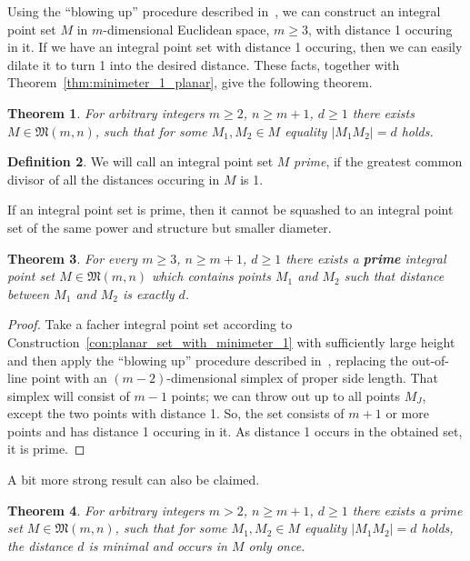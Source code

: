 \documentclass[a4paper,14pt]{article} %
\theoremstyle{plain}
\newtheorem{theorem}{Theorem}[section]
\theoremstyle{definition}
\newtheorem{definition}[theorem]{Definition}
\begin{document}
Using the ``blowing up'' procedure described in~\cite[theorem 1.3]{kurz2008bounds},
we can construct an integral point set $M$ in $m$-dimensional Euclidean space, $m\geq 3$,
with distance 1 occuring in it.
If we have an integral point set with distance 1 occuring,
then we can easily dilate it to turn 1 into the desired distance.
These facts, together with Theorem~\ref{thm:minimeter_1_planar}, give the following theorem.

\begin{theorem}
	For arbitrary integers $m \geq 2$, $n \geq m+1$, $d \geq 1$
	there exists $M\in\mathfrak{M}(m,n)$,
	such that for some $M_1, M_2\in M$ equality $|M_1 M_2| = d$ holds.
\end{theorem}


\begin{definition}
	\cite{noll1989nclusters}
	We will call an integral point set $M$ \textit{prime}, if the greatest common divisor
	of all the distances occuring in $M$ is 1.
\end{definition}

If an integral point set is prime,
then it cannot be squashed to an integral point set of the same power and structure but smaller diameter.


\begin{theorem}
	\label{thm:prime_with_desired_distance}
	For every $m \geq 3$, $n \geq m+1$, $d \geq 1$ there exists a \textbf{prime}
	integral point set $M\in\mathfrak{M}(m,n)$ which
	contains points $M_1$ and $M_2$ such that distance between $M_1$ and $M_2$ is exactly $d$.
\end{theorem}

\begin{proof}
	Take a facher integral point set according to Construction~\ref{con:planar_set_with_minimeter_1}
	with sufficiently large height and then apply the ``blowing up'' procedure described in~\cite[Theorem 1.3]{kurz2008bounds},
	replacing the out-of-line point with an $(m-2)$-dimensional simplex of proper side length.
	That simplex will consist of $m-1$ points;
	we can throw out up to all points $M_J$, except the two points with distance 1.
	So, the set consists of $m+1$ or more points and has distance 1 occuring in it.
	As distance 1 occurs in the obtained set, it is prime.
\end{proof}

A bit more strong result can also be claimed.

\begin{theorem}
	\label{thm:prime_with_unique_desired_distance}
	For arbitrary integers $m > 2$, $n \geq m+1$, $d \geq 1$
	there exists a prime set $M\in\mathfrak{M}(m,n)$,
	such that for some $M_1, M_2\in M$ equality $|M_1 M_2| = d$ holds,
	the distance $d$ is minimal and occurs in $M$ only once.
\end{theorem}
\end{document}
